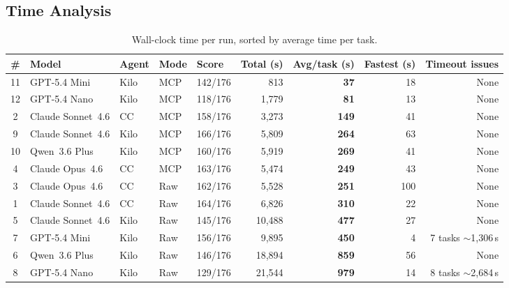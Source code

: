 \subsection{Time Analysis}

\begin{table}[h]
\centering
\small
\caption{Wall-clock time per run, sorted by average time per task.}\label{tab:time}
\setlength{\tabcolsep}{4pt}
\begin{tabular}{cllllrrrr}
\toprule
\textbf{\#} & \textbf{Model} & \textbf{Agent} & \textbf{Mode}
  & \textbf{Score} & \textbf{Total (s)} & \textbf{Avg/task (s)}
  & \textbf{Fastest (s)} & \textbf{Timeout issues} \\
\midrule
11 & GPT-5.4 Mini      & Kilo & MCP & 142/176 &  813 &  \textbf{37} & 18 & None \\
12 & GPT-5.4 Nano      & Kilo & MCP & 118/176 & 1,779 & \textbf{81} & 13 & None \\
 2 & Claude Sonnet~4.6 & CC   & MCP & 158/176 & 3,273 & \textbf{149} & 41 & None \\
 9 & Claude Sonnet~4.6 & Kilo & MCP & 166/176 & 5,809 & \textbf{264} & 63 & None \\
10 & Qwen~3.6 Plus     & Kilo & MCP & 160/176 & 5,919 & \textbf{269} & 41 & None \\
 4 & Claude Opus~4.6   & CC   & MCP & 163/176 & 5,474 & \textbf{249} & 43 & None \\
 3 & Claude Opus~4.6   & CC   & Raw & 162/176 & 5,528 & \textbf{251} & 100 & None \\
 1 & Claude Sonnet~4.6 & CC   & Raw & 164/176 & 6,826 & \textbf{310} & 22 & None \\
 5 & Claude Sonnet~4.6 & Kilo & Raw & 145/176 & 10,488 & \textbf{477} & 27 & None \\
 7 & GPT-5.4 Mini      & Kilo & Raw & 156/176 & 9,895 & \textbf{450} & 4 & 7 tasks $\sim$1,306\,s \\
 6 & Qwen~3.6 Plus     & Kilo & Raw & 146/176 & 18,894 & \textbf{859} & 56 & None \\
 8 & GPT-5.4 Nano      & Kilo & Raw & 129/176 & 21,544 & \textbf{979} & 14 & 8 tasks $\sim$2,684\,s \\
\bottomrule
\end{tabular}
\end{table}

